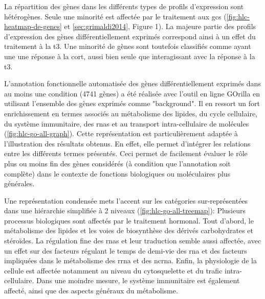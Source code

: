 \documentclass[../main.tex]{subfiles}
\begin{document}
La répartition des gènes dans les différents types de profils d'expression sont hétérogènes.
Seule une minorité est affectée par le traitement aux \glspl{gc} (\autoref{fig:hlc-heatmap-de-genes} et \autoref{sec:grimaldi2014}, Figure 1).
La majeure partie des profils d'expression des gènes différentiellement exprimés correspond ainsi à un effet du traitement à la \gls{t3}.
Une minorité de gènes sont toutefois classifiés comme ayant une une réponse à la \gls{cort}, aussi bien seule que interagissant avec la réponse à la \gls{t3}.



L'annotation fonctionnelle automatisée des gènes différentiellement exprimés dans au moins une condition (4741 gènes) a été réalisée avec l'outil en ligne GOrilla en utilisant l'ensemble des gènes exprimés comme "background".
Il en ressort un fort enrichissement en termes associés au métabolisme des lipides, du cycle cellulaire, du système immunitaire, des \glspl{rna} et au transport intra-cellulaire de molécules (\autoref{fig:hlc-go-all-graph}).
Cette représentation est particulièrement adaptée à l'illustration des résultats obtenus.
En effet, elle permet d'intégrer les relations entre les différents termes présentés.
Ceci permet de facilement évaluer le rôle plus ou moins fin des gènes considérés (à condition que l'annotation soit complète) dans le contexte de fonctions biologiques ou moléculaires plus générales.



Une représentation condensée mets l'accent sur les catégories sur-représentées dans une hiérarchie simplifiée à 2 niveaux (\autoref{fig:hlc-go-all-treemap}):
Plusieurs processus biologiques sont affectés par le traitement hormonal.
Tout d'abord, le métabolisme des lipides et les voies de biosynthèse des dérivés carbohydrates et stéroïdes.
La régulation fine des \glspl{rna} et leur traduction semble aussi affectée, avec un effet sur des facteurs régulant le temps de demi-vie des \gls{rna} et des facteurs impliquées dans le métabolisme des \gls{rrna} et des \gls{ncrna}.
Enfin, la physiologie de la cellule est affectée notamment au niveau du cytosquelette et du trafic intra-cellulaire.
Dans une moindre mesure, le système immunitaire est également affecté, ainsi que des aspects généraux du métabolisme.



\end{document}
